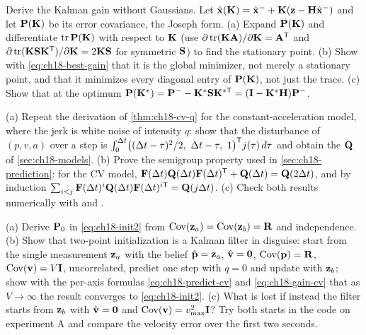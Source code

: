 \begin{exercise}[\difficulty{2}]
\label{exr:ch18-gain}
Derive the Kalman gain without Gaussians. Let
$\hat{\mathbf{x}}(\mathbf{K})=\hat{\mathbf{x}}^-+\mathbf{K}(\mathbf{z}-\mathbf{H}\hat{\mathbf{x}}^-)$
and let $\mathbf{P}(\mathbf{K})$ be its error covariance, the Joseph form. (a)
Expand $\mathbf{P}(\mathbf{K})$ and differentiate $\operatorname{tr}\mathbf{P}(\mathbf{K})$ with respect
to $\mathbf{K}$ (use $\partial\operatorname{tr}(\mathbf{K}\mathbf{A})/\partial\mathbf{K}=\mathbf{A}^{\mathsf{T}}$ and
$\partial\operatorname{tr}(\mathbf{K}\mathbf{S}\mathbf{K}^{\mathsf{T}})/\partial\mathbf{K}=2\mathbf{K}\mathbf{S}$ for
symmetric $\mathbf{S}$) to find the stationary point. (b) Show with
\cref{eq:ch18-best-gain} that it is the global minimizer, not merely a
stationary point, and that it minimizes every diagonal entry of
$\mathbf{P}(\mathbf{K})$, not just the trace. (c) Show that at the optimum
$\mathbf{P}(\mathbf{K}^*)=\mathbf{P}^--\mathbf{K}^*\mathbf{S}\mathbf{K}^{*\mathsf{T}}=(\mathbf{I}-\mathbf{K}^*\mathbf{H})\mathbf{P}^-$.
\end{exercise}

\begin{exercise}[\difficulty{2}]
\label{exr:ch18-q}
(a) Repeat the derivation of \cref{thm:ch18-cv-q} for the
constant-acceleration model, where the jerk is white noise of intensity $q$:
show that the disturbance of $(p,v,a)$ over a step is
$\int_0^{\dt}\bigl((\dt-\tau)^2/2,\ \dt-\tau,\ 1\bigr)\T j(\tau)\,d\tau$ and
obtain the $\mathbf{Q}$ of \cref{sec:ch18-models}. (b) Prove the semigroup
property used in \cref{sec:ch18-prediction}: for the CV model,
$\mathbf{F}(\Delta t)\mathbf{Q}(\Delta t)\mathbf{F}(\Delta t)^{\mathsf{T}}+\mathbf{Q}(\Delta t)=\mathbf{Q}(2\Delta t)$, and by
induction $\sum_{i<j}\mathbf{F}(\Delta t)^i\mathbf{Q}(\Delta t)\mathbf{F}(\Delta t)^{i\mathsf{T}}=\mathbf{Q}(j\Delta t)$.
(c) Check both results numerically with  and
.
\end{exercise}

\begin{exercise}[\difficulty{2}]
\label{exr:ch18-init}
(a) Derive $\mathbf{P}_0$ in \cref{eq:ch18-init2} from
$\operatorname{Cov}(\mathbf{z}_a)=\operatorname{Cov}(\mathbf{z}_b)=\mathbf{R}$ and independence. (b) Show that
two-point initialization is a Kalman filter in disguise: start from the
single measurement $\mathbf{z}_a$ with the belief $\hat{\mathbf{p}}=\mathbf{z}_a$,
$\hat{\mathbf{v}}=\mathbf{0}$, $\operatorname{Cov}(\mathbf{p})=\mathbf{R}$, $\operatorname{Cov}(\mathbf{v})=V\mathbf{I}$, uncorrelated,
predict one step with $q=0$ and update with $\mathbf{z}_b$; show with the per-axis
formulas \cref{eq:ch18-predict-cv} and \cref{eq:ch18-gain-cv} that as
$V\to\infty$ the result converges to \cref{eq:ch18-init2}. (c) What is lost
if instead the filter starts from $\mathbf{z}_b$ with $\hat{\mathbf{v}}=\mathbf{0}$ and
$\operatorname{Cov}(\mathbf{v})=v_{\max}^2\mathbf{I}$? Try both starts in the code on experiment A
and compare the velocity error over the first two seconds.
\end{exercise}

